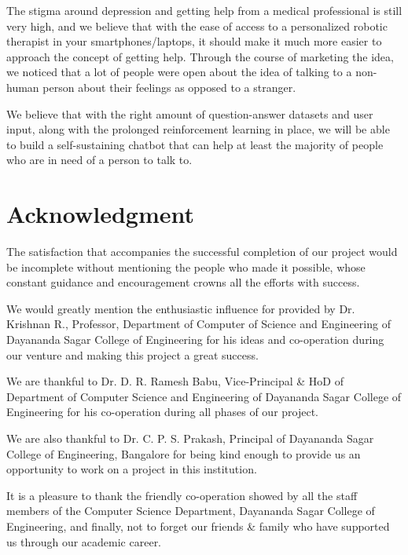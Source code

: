 \documentclass[conference,compsoc]{IEEEtran}
\begin{document}
The stigma around depression and getting help from a medical professional is still very high, and we believe that with the ease of access to a personalized robotic therapist in your smartphones/laptops, it should make it much more easier to approach the concept of getting help. Through the course of marketing the idea, we noticed that a lot of people were open about the idea of talking to a non-human person about their feelings as opposed to a stranger.

We believe that with the right amount of question-answer datasets and user input, along with the prolonged reinforcement learning in place, we will be able to build a self-sustaining chatbot that can help at least the majority of people who are in need of a person to talk to.


\section{Acknowledgment}

The satisfaction that accompanies the successful completion of our project would be incomplete without mentioning the people who made it possible, whose constant guidance and encouragement crowns all the efforts with success.

We would greatly mention the enthusiastic influence for provided by Dr. Krishnan R., Professor, Department of Computer of Science and Engineering of Dayananda Sagar College of Engineering for his ideas and co-operation during our venture and making this project a great success.

We are thankful to Dr. D. R. Ramesh Babu, Vice-Principal \& HoD of Department of Computer Science and Engineering of Dayananda Sagar College of Engineering for his co-operation during all phases of our project.

We are also thankful to Dr. C. P. S. Prakash, Principal of Dayananda Sagar College of Engineering, Bangalore for being kind enough to provide us an opportunity to work on a project in this institution.

It is a pleasure to thank the friendly co-operation showed by all the staff members of the Computer Science Department, Dayananda Sagar College of Engineering, and finally, not to forget our friends \& family who have supported us through our academic career.

\printbibliography
\end{document}
